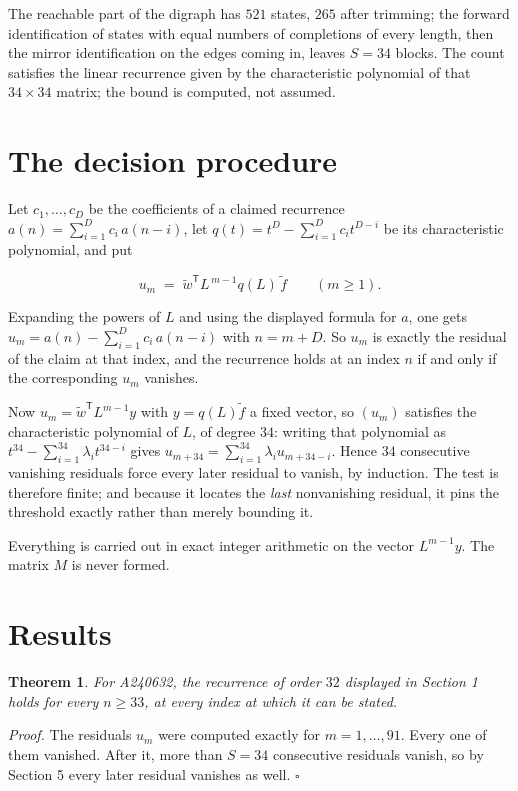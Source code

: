 \documentclass[11pt]{article}
\newtheorem{theorem}{Theorem}
\theoremstyle{definition}
\begin{document}
The reachable part of the digraph has $521$ states, $265$ after trimming; the forward identification of states with equal numbers of completions of every length, then the mirror identification on the edges coming in, leaves $S = 34$ blocks. The count satisfies the linear recurrence given by the characteristic polynomial of that $34\times34$ matrix; the bound is computed, not assumed.

\section{The decision procedure}

Let $c_1,\dots,c_D$ be the coefficients of a claimed recurrence $a(n) = \sum_{i=1}^{D} c_i\,a(n-i)$, let $q(t) = t^{D} - \sum_{i=1}^{D} c_i t^{D-i}$ be its characteristic polynomial, and put

\[u_m \;=\; \tilde w^{\mathsf T} L^{\,m-1} q(L)\,\tilde f \qquad (m \ge 1).\]

Expanding the powers of $L$ and using the displayed formula for $a$, one gets $u_m = a(n) - \sum_{i=1}^{D} c_i\,a(n-i)$ with $n = m + D$. So $u_m$ is exactly the residual of the claim at that index, and the recurrence holds at an index $n$ if and only if the corresponding $u_m$ vanishes.

Now $u_m = \tilde w^{\mathsf T} L^{m-1} y$ with $y = q(L)\tilde f$ a fixed vector, so $(u_m)$ satisfies the characteristic polynomial of $L$, of degree $34$: writing that polynomial as $t^{34} - \sum_{i=1}^{34} \lambda_i t^{34-i}$ gives $u_{m+34} = \sum_{i=1}^{34} \lambda_i u_{m+34-i}$. Hence $34$ consecutive vanishing residuals force every later residual to vanish, by induction. The test is therefore finite; and because it locates the {\itshape last} nonvanishing residual, it pins the threshold exactly rather than merely bounding it.

Everything is carried out in exact integer arithmetic on the vector $L^{m-1}y$. The matrix $M$ is never formed.

\section{Results}

\begin{theorem} For A240632, the recurrence of order $32$ displayed in Section 1 holds for every $n \ge 33$, at every index at which it can be stated.\end{theorem}

{\itshape Proof.} The residuals $u_m$ were computed exactly for $m = 1,\dots,91$. Every one of them vanished. After it, more than $S = 34$ consecutive residuals vanish, so by Section 5 every later residual vanishes as well. $\square$
\end{document}
